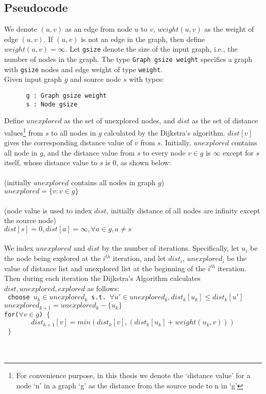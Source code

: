 
\subsection{Pseudocode} \label{pseudo}
We denote $(u, v)$ as an edge from node $u$ to $v$, $weight(u, v)$ as the weight of edge $(u, v)$. If $(u, v)$ is not an edge in the graph, then define $weight(u, v) = \infty$. Let \texttt{gsize} denote the size of the input graph, i.e., the number of nodes in the graph. The type \texttt{Graph gsize weight} specifies a graph with \texttt{gsize} nodes and edge weight of type \texttt{weight}. 
\\
Given input graph $g$ and source node $s$ with types:
\begin{lstlisting}
      g : Graph gsize weight
      s : Node gsize
\end{lstlisting}

Define $unexplored$ as the set of unexplored nodes, and $dist$ as the set of distance values\footnote{For convenience purpose, in this thesis we denote the `distance value' for a node `n' in a graph `g' as the distance from the source node to n in `g'} from $s$ to all nodes in $g$ calculated by the Dijkstra's algorithm. $dist[v]$ gives the corresponding distance value of $v$ from $s$. Initially, $unexplored$ contains all node in $g$, and the distance value from $s$ to every node $v \in g$ is $\infty$ except for $s$ itself, whose distance value to $s$ is 0, as shown below:  
\\\\
\tab (initially $unexplored$ contains all nodes in graph $g$)\\
\tab $unexplored = \{v : v \in g\}$
\\\\
\tab (node value is used to index $dist$, initially distance of all nodes are infinity except 
\\ \tab the source node)\\
\tab $dist[s] = 0, dist[a] = \infty, \forall a \in g, a \neq s$
\\\\
We index $unexplored$ and $dist$ by the number of iterations. Specifically, let $u_i$ be the node being explored at the $i^{th}$ iteration, and let $dist_i$, $unexplored_i$ be the value of distance list and unexplored list at the beginning of the $i^{th}$ iteration. Then during each iteration the Dijkstra's Algorithm calculates $dist, unexplored, explored$ as follows:
\\
\texttt{
  \tab\tab choose $u_k \in unexplored_k$ s.t. $\forall u' \in unexplored_k, dist_k[u_k] \leq dist_k[u']$ \\
  \tab\tab $unexplored_{k+1} = unexplored_k - \{u_k\}$                    \\
  \tab\tab for($\forall v \in g$) $\{$
  \tab\[
  	dist_{k+1}[v] = min(dist_k[v], (dist_k[u_k] + weight(u_k,v)))
  \]    
  \tab\tab $\}$ \\
}
\\\\

